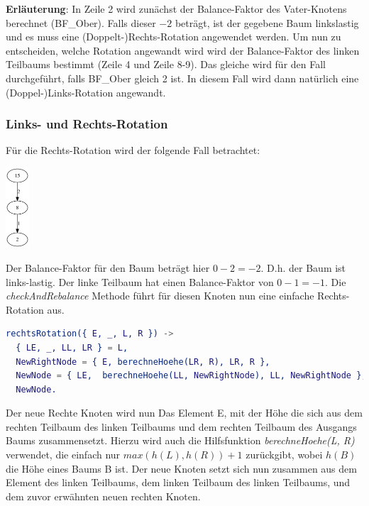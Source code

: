 \documentclass{article}
\begin{document}
	\textbf{Erläuterung}: In Zeile 2 wird zunächst der Balance-Faktor des Vater-Knotens berechnet (BF\_Ober). Falls dieser $-2$ beträgt, ist der gegebene Baum linkslastig und es muss eine (Doppelt-)Rechts-Rotation angewendet werden. Um nun zu entscheiden, welche Rotation angewandt wird wird der Balance-Faktor des linken Teilbaums bestimmt (Zeile 4 und Zeile 8-9).
	Das gleiche wird für den Fall durchgeführt, falls BF\_Ober gleich 2 ist. In diesem Fall wird dann natürlich eine (Doppel-)Links-Rotation angewandt.
	
	\subsubsection{Links- und Rechts-Rotation}
	
	Für die Rechts-Rotation wird der folgende Fall betrachtet:
	
	\begin{center}
   	\includegraphics[height=3cm]{2.png}
	\end{center}
	
	Der Balance-Faktor für den Baum beträgt hier $0 - 2 = -2$. D.h. der Baum ist links-lastig. Der linke Teilbaum hat einen Balance-Faktor von $0 - 1 = -1$. Die \textit{checkAndRebalance} Methode führt für diesen Knoten nun eine einfache Rechts-Rotation aus.
	
	\begin{lstlisting}[language=erlang]
rechtsRotation({ E, _, L, R }) ->
  { LE, _, LL, LR } = L,
  NewRightNode = { E, berechneHoehe(LR, R), LR, R },
  NewNode = { LE,  berechneHoehe(LL, NewRightNode), LL, NewRightNode },
  NewNode.
	\end{lstlisting}
  
  	Der neue Rechte Knoten wird nun Das Element E, mit der Höhe die sich aus dem rechten Teilbaum des linken Teilbaums und dem rechten Teilbaum des Ausgangs Baums zusammensetzt. Hierzu wird auch die Hilfsfunktion \textit{berechneHoehe(L, R)} verwendet, die einfach nur $max(h(L), h(R)) + 1$ zurückgibt, wobei $h(B)$ die Höhe eines Baums B ist.
  	Der neue Knoten setzt sich nun zusammen aus dem Element des linken Teilbaums, dem linken Teilbaum des linken Teilbaums, und dem zuvor erwähnten neuen rechten Knoten.
  	
\end{document}

